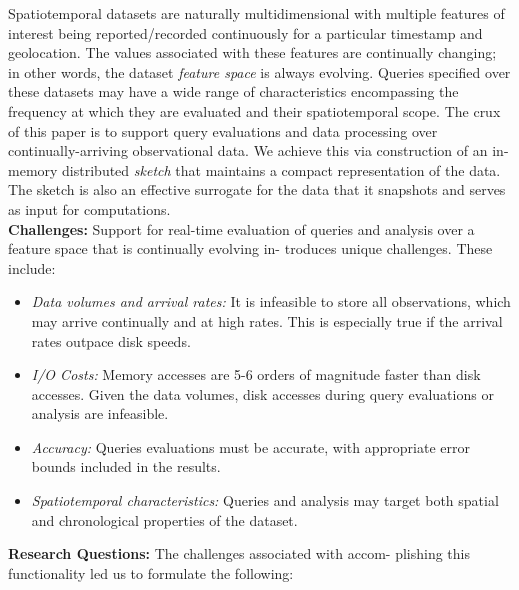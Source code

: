 \documentclass[9pt,journal,compsoc]{IEEEtran}
\begin{document}
Spatiotemporal datasets are naturally multidimensional with multiple features of interest being reported/recorded continuously for a particular timestamp and geolocation. The values associated with these features are continually changing; in other words, the dataset \emph{feature space} is always evolving.  Queries specified over these datasets may have a wide range of characteristics encompassing the frequency at which they are evaluated and their spatiotemporal scope. The crux of this paper is to support query evaluations and data processing over continually-arriving observational data. We achieve this via construction of an in-memory distributed \emph{sketch} that maintains a compact representation of the data.
The sketch is also an effective surrogate for the data that it snapshots and serves as input for computations.
%
%
\vspace{1.7em}\\
%
\textbf{Challenges:} Support for real-time evaluation of queries and analysis over a feature space that is continually evolving in- troduces unique challenges. These include:
\begin{itemize}[leftmargin=*]
    \item   \emph{Data volumes and arrival rates:} It is infeasible to store all observations, which may arrive continually and at high rates. This is especially true if the arrival rates outpace disk speeds.
    \item \emph{I/O Costs:} Memory accesses are 5-6 orders of magnitude faster than disk accesses. Given the data volumes, disk accesses during query evaluations or analysis are infeasible.
    \item   \emph{Accuracy:} Queries evaluations must be accurate, with appropriate error bounds included in the results.
    \item   \emph{Spatiotemporal characteristics:} Queries and analysis may target both spatial and chronological properties of the dataset.
\end{itemize}
%
\vspace{0.7em}
%
\textbf{Research Questions:} The challenges associated with accom- plishing this functionality led us to formulate the following:
\end{document}
